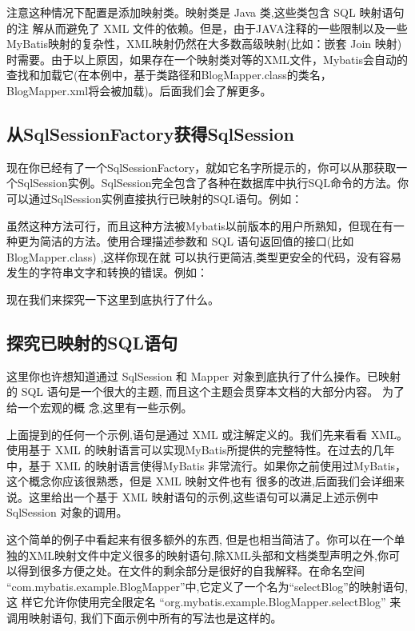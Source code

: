 

注意这种情况下配置是添加映射类。映射类是 Java 类,这些类包含 SQL 映射语句的注 解从而避免了 XML 文件的依赖。但是，由于JAVA注释的一些限制以及一些MyBatis映射的复杂性，XML映射仍然在大多数高级映射(比如：嵌套 Join 映射)时需要。由于以上原因，如果存在一个映射类对等的XML文件，Mybatis会自动的查找和加载它(在本例中，基于类路径和BlogMapper.class的类名，BlogMapper.xml将会被加载)。后面我们会了解更多。

\subsection{从SqlSessionFactory获得SqlSession}

现在你已经有了一个SqlSessionFactory，就如它名字所提示的，你可以从那获取一个SqlSession实例。SqlSession完全包含了各种在数据库中执行SQL命令的方法。你可以通过SqlSession实例直接执行已映射的SQL语句。例如：



虽然这种方法可行，而且这种方法被Mybatis以前版本的用户所熟知，但现在有一种更为简洁的方法。使用合理描述参数和 SQL 语句返回值的接口(比如 BlogMapper.class) ,这样你现在就 可以执行更简洁,类型更安全的代码，没有容易发生的字符串文字和转换的错误。例如：



现在我们来探究一下这里到底执行了什么。
\subsection{探究已映射的SQL语句}
这里你也许想知道通过 SqlSession 和 Mapper 对象到底执行了什么操作。已映射的 SQL 语句是一个很大的主题, 而且这个主题会贯穿本文档的大部分内容。 为了给一个宏观的概 念,这里有一些示例。

上面提到的任何一个示例,语句是通过 XML 或注解定义的。我们先来看看 XML。使用基于 XML 的映射语言可以实现MyBatis所提供的完整特性。在过去的几年中，基于 XML 的映射语言使得MyBatis 非常流行。如果你之前使用过MyBatis，这个概念你应该很熟悉，但是 XML 映射文件也有 很多的改进,后面我们会详细来说。这里给出一个基于 XML 映射语句的示例,这些语句可以满足上述示例中 SqlSession 对象的调用。




这个简单的例子中看起来有很多额外的东西, 但是也相当简洁了。你可以在一个单独的XML映射文件中定义很多的映射语句,除XML头部和文档类型声明之外,你可以得到很多方便之处。在文件的剩余部分是很好的自我解释。在命名空间 “com.mybatis.example.BlogMapper”中,它定义了一个名为“selectBlog”的映射语句,这 样它允许你使用完全限定名 “org.mybatis.example.BlogMapper.selectBlog” 来调用映射语句, 我们下面示例中所有的写法也是这样的。

